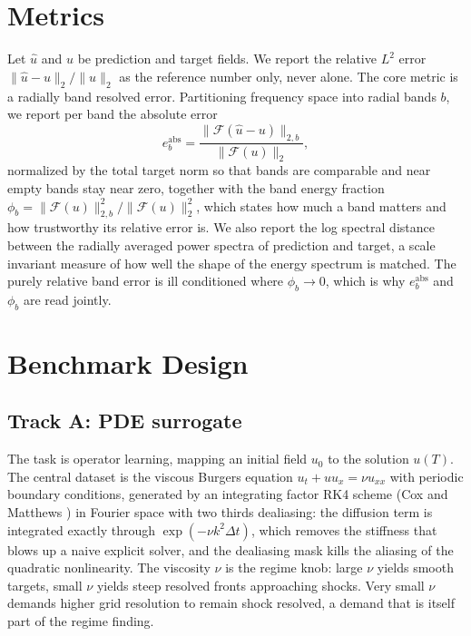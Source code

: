 \documentclass[conference]{IEEEtran}
\begin{document}
\section{Metrics}
Let $\hat u$ and $u$ be prediction and target fields. We report the relative $L^2$ error $\lVert \hat u - u\rVert_2 / \lVert u\rVert_2$ as the reference number only, never alone. The core metric is a radially band resolved error. Partitioning frequency space into radial bands $b$, we report per band the absolute error
\begin{equation}
e^{\mathrm{abs}}_b = \frac{\lVert \mathcal{F}(\hat u - u)\rVert_{2,b}}{\lVert \mathcal{F}(u)\rVert_2},
\end{equation}
normalized by the total target norm so that bands are comparable and near empty bands stay near zero, together with the band energy fraction $\phi_b = \lVert \mathcal{F}(u)\rVert_{2,b}^2 / \lVert \mathcal{F}(u)\rVert_2^2$, which states how much a band matters and how trustworthy its relative error is. We also report the log spectral distance between the radially averaged power spectra of prediction and target, a scale invariant measure of how well the shape of the energy spectrum is matched. The purely relative band error is ill conditioned where $\phi_b \to 0$, which is why $e^{\mathrm{abs}}_b$ and $\phi_b$ are read jointly.

\section{Benchmark Design}
\subsection{Track A: PDE surrogate}
The task is operator learning, mapping an initial field $u_0$ to the solution $u(T)$. The central dataset is the viscous Burgers equation $u_t + u u_x = \nu u_{xx}$ with periodic boundary conditions, generated by an integrating factor RK4 scheme (Cox and Matthews \cite{cox2002etd}) in Fourier space with two thirds dealiasing: the diffusion term is integrated exactly through $\exp(-\nu k^2 \Delta t)$, which removes the stiffness that blows up a naive explicit solver, and the dealiasing mask kills the aliasing of the quadratic nonlinearity. The viscosity $\nu$ is the regime knob: large $\nu$ yields smooth targets, small $\nu$ yields steep resolved fronts approaching shocks. Very small $\nu$ demands higher grid resolution to remain shock resolved, a demand that is itself part of the regime finding.
\end{document}
